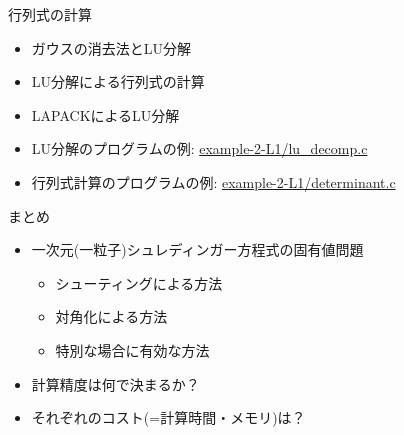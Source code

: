\documentclass[dvipdfmx]{beamer}
\begin{document}
\begin{frame}[t,fragile]{行列式の計算}
  \begin{itemize}
    \setlength{\itemsep}{1em}
  \item ガウスの消去法とLU分解
  \item LU分解による行列式の計算
  \item LAPACKによるLU分解
  \item LU分解のプログラムの例: \href{https://github.com/todo-group/computer-experiments/blob/master/exercise/linear_system/lu_decomp.c}{example-2-L1/lu\_decomp.c}
  \item 行列式計算のプログラムの例: \href{https://github.com/todo-group/computer-experiments/blob/master/exercise/linear_system/determinant.c}{example-2-L1/determinant.c}
  \end{itemize}
\end{frame}















\begin{frame}[t,fragile]{まとめ}
  \begin{itemize}
    \setlength{\itemsep}{1em}
  \item 一次元(一粒子)シュレディンガー方程式の固有値問題
    \begin{itemize}
    \item シューティングによる方法
    \item 対角化による方法
    \item 特別な場合に有効な方法
    \end{itemize}
  \item 計算精度は何で決まるか？
  \item それぞれのコスト(=計算時間・メモリ)は？
  \end{itemize}
\end{frame}
\end{document}
